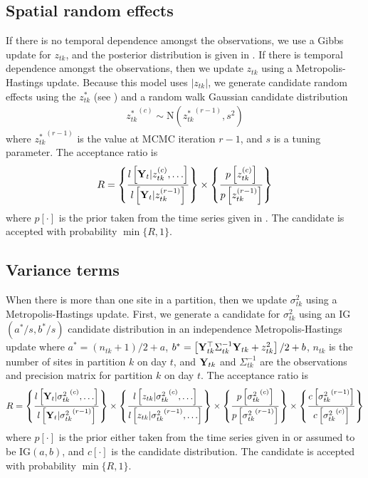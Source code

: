 \subsection*{Spatial random effects}
If there is no temporal dependence amongst the observations, we use a Gibbs update for $z_{tk}$, and the posterior distribution is given in .
If there is temporal dependence amongst the observations, then we update $z_{tk}$ using a Metropolis-Hastings update.
Because this model uses $|z_{tk}|$, we generate candidate random effects using the $z^*_{tk}$ (see ) and a random walk Gaussian candidate distribution
\begin{align*}
  {z^*_{tk}}^{(c)} \sim \text{N}({z^*_{tk}}^{(r - 1)}, s^2)
\end{align*}
where ${z^*_{tk}}^{(r-1)}$ is the value at MCMC iteration $r - 1$, and $s$ is a tuning parameter.
The acceptance ratio is
\begin{align*}
  R = \left\{ \frac{ l\left[\mathbf{Y}_t | z_{tk}^{(c)}, \ldots\right] }{ l\left[\mathbf{Y}_t | z_{tk}^{(r - 1)}\right]} \right\} \times \left\{ \frac{ p\left[ z_{tk}^{(c)} \right] }{ p\left[ z_{tk}^{(r - 1)}\right]}\right\}
\end{align*}
where $p[\cdot]$ is the prior taken from the time series given in .
The candidate is accepted with probability $\min\{R, 1\}$.

\subsection*{Variance terms}
When there is more than one site in a partition, then we update $\sigma^2_{tk}$ using a Metropolis-Hastings update.
First, we generate a candidate for $\sigma^2_{tk}$ using an IG$(a^*/s, b^*/s)$ candidate distribution in an independence Metropolis-Hastings update where $a^* = (n_{tk} + 1) / 2 + a$, $b^* = \left[\mathbf{Y}_{tk}^\top \Sigma^{-1}_{tk} \mathbf{Y}_{tk} + z_{tk}^2\right] / 2 + b$, $n_{tk}$ is the number of sites in partition $k$ on day $t$, and $\mathbf{Y}_{tk}$ and $\Sigma^{-1}_{tk}$ are the observations and precision matrix for partition $k$ on day $t$.
The acceptance ratio is
\begin{align*}
  R = \left\{
    \frac{ l\left[\mathbf{Y}_t | {\sigma^2_{tk}}^{(c)}, \ldots\right] }
         { l\left[\mathbf{Y}_t | {\sigma^2_{tk}}^{(r - 1)}\right]}
    \right\} \times \left\{
    \frac{ l\left[z_{tk} | {\sigma^2_{tk}}^{(c)}, \ldots\right] }
         { l\left[z_{tk} | {\sigma^2_{tk}}^{(r - 1)}, \ldots\right] }
    \right\} \times \left\{
    \frac{ p\left[ {\sigma^2_{tk}}^{(c)} \right] }
         { p\left[ {\sigma^2_{tk}}^{(r - 1)}\right] }
    \right\} \times \left\{
    \frac{ c\left[ {\sigma^2_{tk}}^{(r - 1)}\right] }
         { c\left[ {\sigma^2_{tk}}^{(c)}\right]}
    \right\}
\end{align*}
where $p[\cdot]$ is the prior either taken from the time series given in  or assumed to be IG$(a, b)$, and $c[\cdot]$ is the candidate distribution.
The candidate is accepted with probability $\min\{R, 1\}$.

